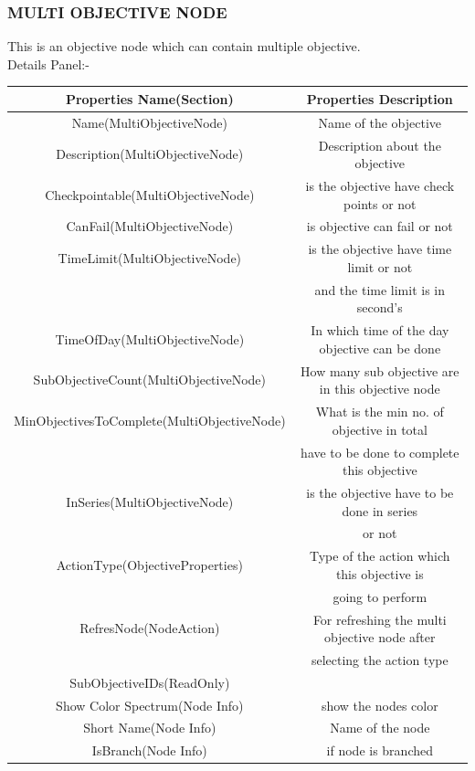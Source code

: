 \documentclass[12pt]{article}
\begin{document}
	  \subsubsection{MULTI OBJECTIVE NODE}
	  This is an objective node which can contain multiple objective.\\
	  Details Panel:-
	  \begin{center}
	  	\begin{tabular}{|c|c|}\hline
	  	Properties Name(Section)& Properties Description\\\hline\hline
	  	Name(MultiObjectiveNode)& Name of the objective\\\hline
	  	Description(MultiObjectiveNode)& Description about the objective\\\hline
	  	Checkpointable(MultiObjectiveNode)& is the objective have check points or not\\\hline
	  	CanFail(MultiObjectiveNode)& is objective can fail or not\\\hline
	  	TimeLimit(MultiObjectiveNode)& is the objective have time limit or not\\
	  	& and the time limit is in second's	\\\hline
	  	TimeOfDay(MultiObjectiveNode)& In which time of the day objective can be done \\\hline
	  	SubObjectiveCount(MultiObjectiveNode)&How many sub objective are in this objective node\\\hline
	  	MinObjectivesToComplete(MultiObjectiveNode)&What is the min no. of objective in total\\
	  	& have to be done to complete this objective\\\hline
	  	InSeries(MultiObjectiveNode)& is the objective have to be done in series \\
	  	&or not\\\hline
	  	ActionType(ObjectiveProperties)&Type of the action which this objective is \\
	  	& going to perform\\\hline
	  	RefresNode(NodeAction)& For refreshing the multi objective node after\\
	  	& selecting the action type\\\hline
	  	SubObjectiveIDs(ReadOnly)&\\\hline
	  						Show Color Spectrum(Node Info) & show the nodes 					color\\\hline
			Short Name(Node Info) & Name of the node\\\hline
			IsBranch(Node Info) & if node is branched\\\hline
	  	
	  	\end{tabular}
	  \end{center}
\end{document}
